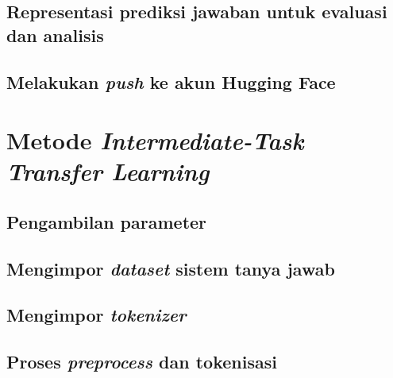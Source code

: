 \subsection{Representasi prediksi jawaban untuk evaluasi dan analisis}

\subsection{Melakukan \emph{push} ke akun Hugging Face}

\section{Metode \emph{Intermediate-Task Transfer Learning}}

\subsection{Pengambilan parameter}

\subsection{Mengimpor \emph{dataset} sistem tanya jawab}

\subsection{Mengimpor \emph{tokenizer}}

\subsection{Proses \emph{preprocess} dan tokenisasi}

